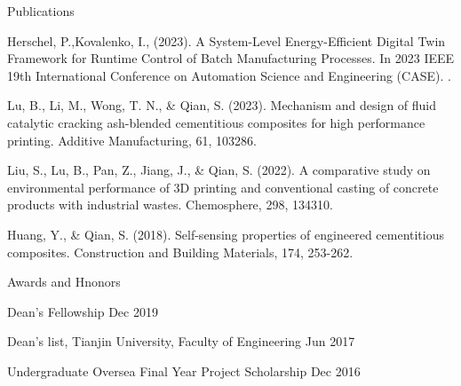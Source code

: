 \documentclass{resume}
\begin{document}
\begin{rSection}{Publications}
\vspace{-10pt}
\item {\color{blue}{Li, H.,}} Herschel, P.,Kovalenko, I., (2023). A System-Level Energy-Efficient Digital Twin Framework for Runtime Control of Batch Manufacturing Processes. In 2023 IEEE 19th International Conference on Automation Science and Engineering (CASE). {\color{blue}{Accepted}}.
\item Lu, B., {\color{blue}{Li, H.,}} Li, M., Wong, T. N., \& Qian, S. (2023). Mechanism and design of fluid catalytic cracking ash-blended cementitious composites for high performance printing. Additive Manufacturing, 61, 103286.
\item Liu, S., Lu, B., {\color{blue}{Li, H.,}} Pan, Z., Jiang, J., \& Qian, S. (2022). A comparative study on environmental performance of 3D printing and conventional casting of concrete products with industrial wastes. Chemosphere, 298, 134310.
\item Huang, Y., {\color{blue}{Li, H.,}} \& Qian, S. (2018). Self-sensing properties of engineered cementitious composites. Construction and Building Materials, 174, 253-262.
\end{rSection}

\begin{rSection}{Awards and Hnonors}
\vspace{-10pt}
\item {Dean's Fellowship} \hfill{Dec 2019}
\item {Dean's list, Tianjin University, Faculty of Engineering} \hfill{Jun 2017}
\item {Undergraduate Oversea Final Year Project Scholarship} \hfill{Dec 2016}
\end{rSection}


\end{document}
